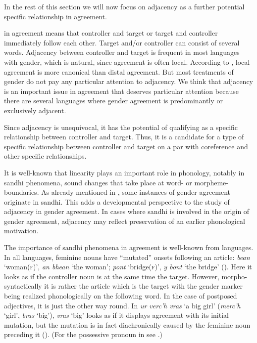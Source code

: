 \documentclass[output=collectionpaper]{langsci/langscibook}
\begin{document}
In the rest of this section we will now focus on adjacency as a further potential specific relationship in agreement.

 in agreement means that controller and target or target and controller immediately follow each other. Target and/or controller can consist of several words. Adjacency between controller and target is frequent in most languages with gender, which is natural, since agreement is often local. According to \cite{Corbett2006}, local agreement is more canonical than distal agreement. But most treatments of gender do not pay any particular attention to adjacency. We think that adjacency is an important issue in agreement that deserves particular attention because there are several languages where gender agreement is predominantly or exclusively adjacent.

Since adjacency is unequivocal, it has the potential of qualifying as a specific relationship between controller and target. Thus, it is a candidate for a type of specific relationship between controller and target on a par with coreference and other specific relationships.

It is well-known that linearity plays an important role in phonology, notably in sandhi phenomena, sound changes that take place at word- or morpheme-boundaries. As already mentioned in , some instances of gender agreement originate in sandhi. This adds a developmental perspective to the study of adjacency in gender agreement. In cases where sandhi is involved in the origin of gender agreement, adjacency may reflect preservation of an earlier phonological motivation.

The importance of sandhi phenomena in agreement is well-known from  languages. In all  languages, feminine nouns have ``mutated'' onsets following an article:  \textit{bean} `woman(\textsc{f})', \textit{an bhean} `the woman';  \textit{pont} `bridge(\textsc{f})', \textit{y bont} `the bridge' (\citealt[480]{Fife1998}). Here it looks as if the controller noun is at the same time the target. However, morpho-syntactically it is rather the article which is the target with the gender marker being realized phonologically on the following word. In the case of postposed adjectives, it is just the other way round. In  \textit{ur verc'h vras} `a big girl' (\textit{merc'h} `girl', \textit{bras} `big'), \textit{vras} `big' looks as if it displays agreement with its initial mutation, but the mutation is in fact diachronically caused by the feminine noun preceding it (\citealt[480]{Fife1998}). (For the possessive pronoun in  see .)
\end{document}
